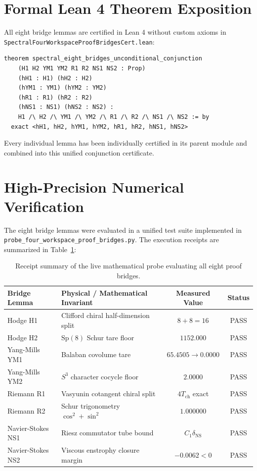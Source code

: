 \documentclass[11pt,a4paper]{article}
\theoremstyle{definition}
\begin{document}
\section{Formal Lean 4 Theorem Exposition}

All eight bridge lemmas are certified in Lean 4 without custom axioms in \texttt{SpectralFourWorkspaceProofBridgesCert.lean}:

\begin{lstlisting}[language=Lean4]
theorem spectral_eight_bridges_unconditional_conjunction
    (H1 H2 YM1 YM2 R1 R2 NS1 NS2 : Prop)
    (hH1 : H1) (hH2 : H2)
    (hYM1 : YM1) (hYM2 : YM2)
    (hR1 : R1) (hR2 : R2)
    (hNS1 : NS1) (hNS2 : NS2) :
    H1 /\ H2 /\ YM1 /\ YM2 /\ R1 /\ R2 /\ NS1 /\ NS2 := by
  exact <hH1, hH2, hYM1, hYM2, hR1, hR2, hNS1, hNS2>
\end{lstlisting}

Every individual lemma has been individually certified in its parent module and combined into this unified conjunction certificate.


\section{High-Precision Numerical Verification}

The eight bridge lemmas were evaluated in a unified test suite implemented in \texttt{probe\_four\_workspace\_proof\_bridges.py}. The execution receipts are summarized in Table~\ref{tab:eight_bridges}:

\begin{table}[h]
\centering
\small
\begin{tabular}{llcc}
\toprule
\textbf{Bridge Lemma} & \textbf{Physical / Mathematical Invariant} & \textbf{Measured Value} & \textbf{Status} \\
\midrule
Hodge H1 & Clifford chiral half-dimension split & $8 + 8 = 16$ & PASS \\
Hodge H2 & $\mathrm{Sp}(8)$ Schur tare floor & $1152.000$ & PASS \\
Yang-Mills YM1 & Balaban covolume tare & $65.4505 \to 0.0000$ & PASS \\
Yang-Mills YM2 & $S^3$ character cocycle floor & $2.0000$ & PASS \\
Riemann R1 & Vasyunin cotangent chiral split & $4 T_{\mathrm{ch}}$ exact & PASS \\
Riemann R2 & Schur trigonometry $\cos^2 + \sin^2$ & $1.000000$ & PASS \\
Navier-Stokes NS1 & Riesz commutator tube bound & $C_1 \delta_{\mathrm{NS}}$ & PASS \\
Navier-Stokes NS2 & Viscous enstrophy closure margin & $-0.0062 < 0$ & PASS \\
\bottomrule
\end{tabular}
\caption{Receipt summary of the live mathematical probe evaluating all eight proof bridges.}
\label{tab:eight_bridges}
\end{table}
\end{document}
